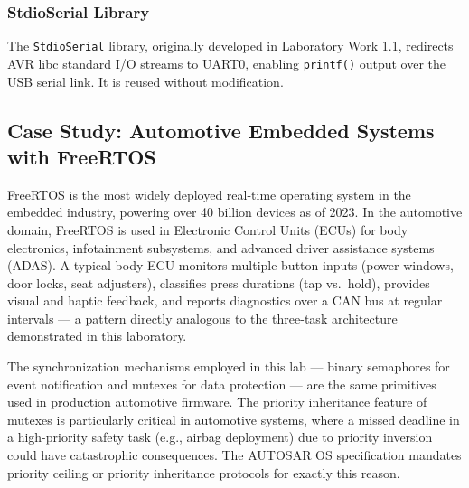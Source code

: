 \subsubsection{StdioSerial Library}

The \texttt{StdioSerial} library, originally developed in Laboratory Work 1.1, redirects AVR libc standard I/O streams to UART0, enabling \texttt{printf()} output over the USB serial link. It is reused without modification.

\subsection{Case Study: Automotive Embedded Systems with FreeRTOS}

FreeRTOS is the most widely deployed real-time operating system in the embedded industry, powering over 40 billion devices as of 2023. In the automotive domain, FreeRTOS is used in Electronic Control Units (ECUs) for body electronics, infotainment subsystems, and advanced driver assistance systems (ADAS). A typical body ECU monitors multiple button inputs (power windows, door locks, seat adjusters), classifies press durations (tap vs.\ hold), provides visual and haptic feedback, and reports diagnostics over a CAN bus at regular intervals --- a pattern directly analogous to the three-task architecture demonstrated in this laboratory.

The synchronization mechanisms employed in this lab --- binary semaphores for event notification and mutexes for data protection --- are the same primitives used in production automotive firmware. The priority inheritance feature of mutexes is particularly critical in automotive systems, where a missed deadline in a high-priority safety task (e.g., airbag deployment) due to priority inversion could have catastrophic consequences. The AUTOSAR OS specification mandates priority ceiling or priority inheritance protocols for exactly this reason.
